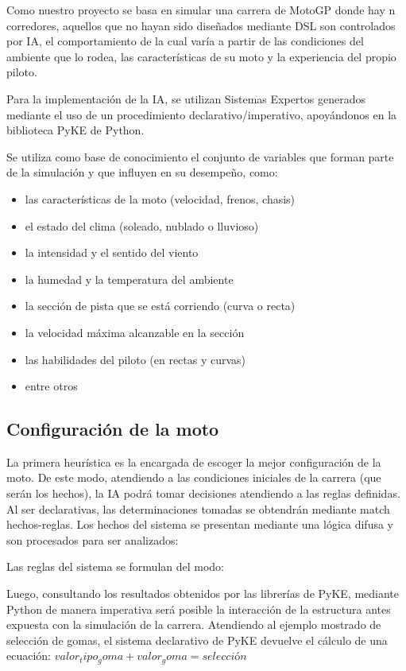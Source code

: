 Como nuestro proyecto se basa en simular una carrera de MotoGP donde hay n corredores, aquellos que no hayan sido diseñados mediante DSL son controlados por IA, el comportamiento de la cual varía a partir de las condiciones del ambiente que lo rodea, las características de su moto y la experiencia del propio piloto.

Para la implementación de la IA, se utilizan Sistemas Expertos generados mediante el uso de un procedimiento declarativo/imperativo, apoyándonos en la biblioteca PyKE de Python.

Se utiliza como base de conocimiento el conjunto de variables que forman parte de la simulación y que influyen en su desempeño, como:
\begin{itemize}
	\item las características de la moto (velocidad, frenos, chasis)
	\item el estado del clima (soleado, nublado o lluvioso)
	\item la intensidad y el sentido del viento
	\item la humedad y la temperatura del ambiente
	\item la sección de pista que se está corriendo (curva o recta)
	\item la velocidad máxima alcanzable en la sección
	\item las habilidades del piloto (en rectas y curvas)
	\item entre otros
\end{itemize}

\subsection{Configuración de la moto}
	La primera heurística es la encargada de escoger la mejor configuración de la moto. De este modo, atendiendo a las condiciones iniciales de la carrera (que serán los hechos), la IA podrá tomar decisiones atendiendo a las reglas definidas. Al ser declarativas, las determinaciones tomadas se obtendrán mediante match hechos-reglas.
	Los hechos del sistema se presentan mediante una lógica difusa y son procesados para ser analizados:

	Las reglas del sistema se formulan del modo:

	Luego, consultando los resultados obtenidos por las librerías de PyKE, mediante Python de manera imperativa será posible la interacción de la estructura antes expuesta con la simulación de la carrera.
	Atendiendo al ejemplo mostrado de selección de gomas, el sistema declarativo de PyKE devuelve el cálculo de una ecuación:
	$valor_tipo_goma + valor_goma = selección$


